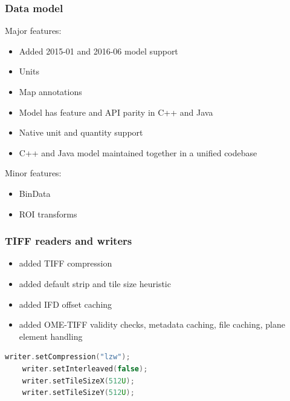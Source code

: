 \documentclass{beamer}
\begin{document}
\begin{frame}[fragile]
  \frametitle{Data model}

  Major features:
  \begin{itemize}
  \item Added 2015-01 and 2016-06 model support
    \pause
  \item Units
  \item Map annotations
  \item Model has feature and API parity in C++ and Java
  \item Native unit and quantity support
  \item C++ and Java model maintained together in a unified codebase
  \end{itemize}
  \pause

  \bigskip
  Minor features:
  \begin{itemize}
  \item BinData
  \item ROI transforms
  \end{itemize}
\end{frame}

\begin{frame}[fragile]
  \frametitle{TIFF readers and writers}

  \begin{itemize}
  \item added TIFF compression
  \item added default strip and tile size heuristic
  \item added IFD offset caching
  \item added OME-TIFF validity checks, metadata caching, file
    caching, plane element handling
  \end{itemize}

  \begin{lstlisting}[language=C++]
    writer.setCompression("lzw");
    writer.setInterleaved(false);
    writer.setTileSizeX(512U);
    writer.setTileSizeY(512U);
  \end{lstlisting}
\end{frame}
\end{document}
